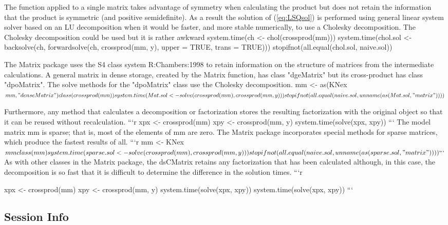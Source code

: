 \documentclass{article}
\begin{document}
The function applied to a single matrix takes
advantage of symmetry when calculating the product but does not retain
the information that the product is symmetric (and positive
semidefinite).  As a result the solution of (\ref{eq:LSQsol}) is
performed using general linear system solver based on an LU
decomposition when it would be faster, and more stable numerically, to
use a Cholesky decomposition.  The Cholesky decomposition could be used
but it is rather awkward
system.time(ch <- chol(crossprod(mm)))
system.time(chol.sol <-
            backsolve(ch, forwardsolve(ch, crossprod(mm, y),
                                       upper = TRUE, trans = TRUE)))
stopifnot(all.equal(chol.sol, naive.sol))

The Matrix package uses the S4 class system
R:Chambers:1998 to retain information on the structure of
matrices from the intermediate calculations.  A general matrix in
dense storage, created by the Matrix function, has class
"dgeMatrix" but its cross-product has class "dpoMatrix".
The solve methods for the "dpoMatrix" class use the
Cholesky decomposition.
mm <- as(KNex$mm, "denseMatrix")
class(crossprod(mm))
system.time(Mat.sol <- solve(crossprod(mm), crossprod(mm, y)))
stopifnot(all.equal(naive.sol, unname(as(Mat.sol,"matrix"))))
$

Furthermore, any method that calculates a
decomposition or factorization stores the resulting factorization with
the original object so that it can be reused without recalculation.
```r
xpx <- crossprod(mm)
xpy <- crossprod(mm, y)
system.time(solve(xpx, xpy))
```
The model matrix mm is sparse; that is, most of the elements of
mm are zero.  The Matrix package incorporates special
methods for sparse matrices, which produce the fastest results of all.
```r
mm <- KNex$mm
class(mm)
system.time(sparse.sol <- solve(crossprod(mm), crossprod(mm, y)))
stopifnot(all.equal(naive.sol, unname(as(sparse.sol, "matrix"))))
```
$
As with other classes in the Matrix package, the
dsCMatrix retains any factorization that has been calculated
although, in this case, the decomposition is so fast that it is
difficult to determine the difference in the solution times.
```r

xpx <- crossprod(mm)
xpy <- crossprod(mm, y)
system.time(solve(xpx, xpy))
system.time(solve(xpx, xpy))
```

\subsection*{Session Info}
\end{document}

